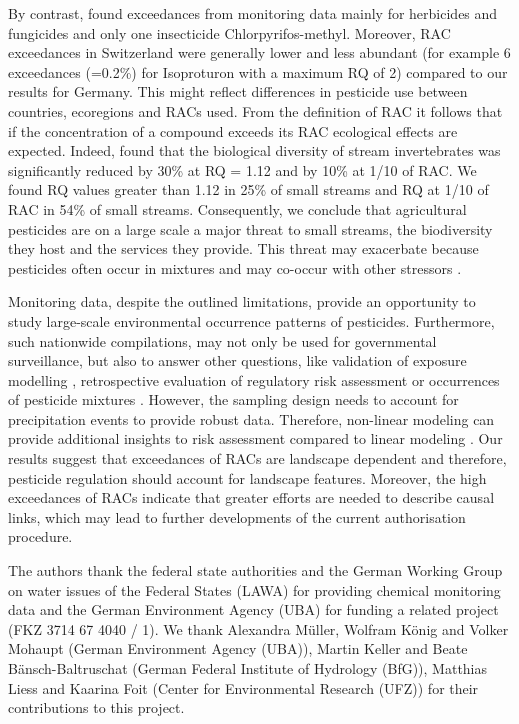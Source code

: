 \documentclass[journal=esthag,manuscript=article]{achemso}
\begin{document}
By contrast, \citet{knauer_pesticides_2016} found exceedances from monitoring data mainly for herbicides and fungicides and only one insecticide Chlorpyrifos-methyl.
Moreover, RAC exceedances in Switzerland were generally lower and less abundant (for example 6 exceedances (=0.2\%) for Isoproturon with a maximum RQ of 2) compared to our results for Germany. 
This might reflect differences in pesticide use between countries, ecoregions and RACs used. 
From the definition of RAC it follows that if the concentration of a compound exceeds its RAC ecological effects are expected.
Indeed, \citet{stehle_agricultural_2015} found that the biological diversity of stream invertebrates was significantly reduced by 30\% at RQ = 1.12 and by 10\% at 1/10 of RAC.
We found RQ values greater than 1.12 in 25\% of small streams and RQ at 1/10 of RAC in 54\% of small streams. 
Consequently, we conclude that agricultural pesticides are on a large scale a major threat to small streams, the biodiversity they host and the services they provide. 
This threat may exacerbate because pesticides often occur in mixtures \cite{schreiner_pesticide_2016} and may co-occur with other stressors \citep{schafer_contribution_2016}. 

Monitoring data, despite the outlined limitations, provide an opportunity to study large-scale environmental occurrence patterns of pesticides.
Furthermore, such nationwide compilations, may not only be used for governmental surveillance, but also to answer other questions, like validation of exposure modelling \cite{knabel_fungicide_2014}, retrospective evaluation of regulatory risk assessment \citep{knauer_pesticides_2016,stehle_pesticide_2015} or occurrences of pesticide mixtures \cite{schreiner_pesticide_2016}.
However, the sampling design needs to account for precipitation events to provide robust data. 
Therefore, non-linear modeling can provide additional insights to risk assessment compared to linear modeling \citep{fewster_analysis_2000}. 
Our results suggest that exceedances of RACs are landscape dependent and therefore, pesticide regulation should account for landscape features. 
Moreover, the high exceedances of RACs indicate that greater efforts are needed to describe causal links, which may lead to further developments of the current authorisation procedure.



\begin{acknowledgement}
The authors thank the federal state authorities and the German Working Group on water issues of the Federal States (LAWA) for providing chemical monitoring data and the German Environment Agency (UBA) for funding a related project (FKZ 3714 67 4040 / 1). 
We thank Alexandra Müller, Wolfram König and Volker Mohaupt (German Environment Agency (UBA)), Martin Keller and Beate Bänsch-Baltruschat (German Federal Institute of Hydrology (BfG)), Matthias Liess and Kaarina Foit (Center for Environmental Research (UFZ)) for their contributions to this project. 
\end{acknowledgement}
\end{document}
